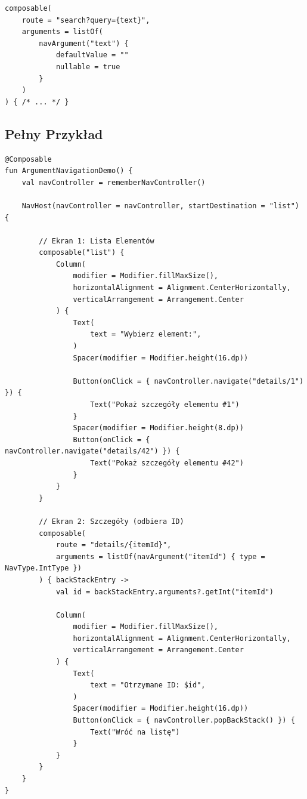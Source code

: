 \begin{verbatim}
composable(
    route = "search?query={text}",
    arguments = listOf(
        navArgument("text") { 
            defaultValue = "" 
            nullable = true
        }
    )
) { /* ... */ }
\end{verbatim}


\subsection{Pełny Przykład}

\begin{verbatim}
@Composable
fun ArgumentNavigationDemo() {
    val navController = rememberNavController()

    NavHost(navController = navController, startDestination = "list") {
        
        // Ekran 1: Lista Elementów
        composable("list") {
            Column(
                modifier = Modifier.fillMaxSize(),
                horizontalAlignment = Alignment.CenterHorizontally,
                verticalArrangement = Arrangement.Center
            ) {
                Text(
                    text = "Wybierz element:", 
                )
                Spacer(modifier = Modifier.height(16.dp))
                
                Button(onClick = { navController.navigate("details/1") }) {
                    Text("Pokaż szczegóły elementu #1")
                }
                Spacer(modifier = Modifier.height(8.dp))
                Button(onClick = { navController.navigate("details/42") }) {
                    Text("Pokaż szczegóły elementu #42")
                }
            }
        }

        // Ekran 2: Szczegóły (odbiera ID)
        composable(
            route = "details/{itemId}",
            arguments = listOf(navArgument("itemId") { type = NavType.IntType })
        ) { backStackEntry ->
            val id = backStackEntry.arguments?.getInt("itemId")
            
            Column(
                modifier = Modifier.fillMaxSize(),
                horizontalAlignment = Alignment.CenterHorizontally,
                verticalArrangement = Arrangement.Center
            ) {
                Text(
                    text = "Otrzymane ID: $id", 
                )
                Spacer(modifier = Modifier.height(16.dp))
                Button(onClick = { navController.popBackStack() }) {
                    Text("Wróć na listę")
                }
            }
        }
    }
}
\end{verbatim}


